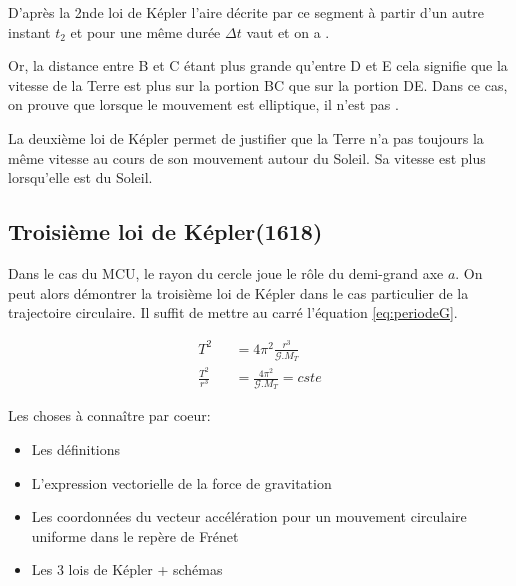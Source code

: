 D'après la 2nde loi de Képler l'aire décrite par ce segment à partir d'un autre instant $t_2$ et pour une même durée $\Delta t$ vaut  et on a .

Or, la distance entre B et C étant plus grande qu'entre D et E cela signifie que la vitesse de la Terre est plus  sur la portion BC que sur la portion DE. Dans ce cas, on prouve que lorsque le mouvement est elliptique, il n'est pas .


 La deuxième loi de Képler permet de justifier que la Terre n'a pas toujours la même vitesse au cours de son mouvement autour du Soleil. Sa vitesse est plus  lorsqu'elle est  du Soleil.

\subsection{Troisième loi de Képler(1618)}


Dans le cas du MCU, le rayon du cercle joue le rôle du demi-grand axe $a$.
On peut alors démontrer la troisième loi de Képler dans le cas particulier de la trajectoire circulaire. Il suffit de mettre au carré l'équation  \ref{eq:periodeG}. 

\begin{eqnarray}
T^2 && =4\pi^2\frac{r^3}{\mathcal{G}.M_T}  \\
\frac{T^2}{r^3} && =\frac{4 \pi^2}{\mathcal{G}.M_T}=cste 
\end{eqnarray}


Les choses à connaître par coeur:
\begin{itemize}
	\item Les définitions
	\item L'expression vectorielle de la force de gravitation
	\item Les coordonnées du vecteur accélération pour un mouvement circulaire uniforme dans le repère de Frénet
	\item Les 3 lois de Képler + schémas
\end{itemize}


